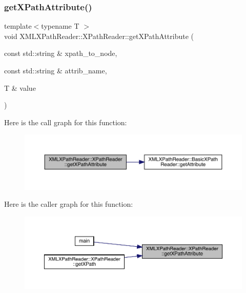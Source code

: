 \subsubsection{\texorpdfstring{getXPathAttribute()}{getXPathAttribute()}\hspace{0.1cm}{\footnotesize\ttfamily [1/2]}}
{\footnotesize\ttfamily template$<$typename T $>$ \\
void X\+M\+L\+X\+Path\+Reader\+::\+X\+Path\+Reader\+::get\+X\+Path\+Attribute (\begin{DoxyParamCaption}\item[{const std\+::string \&}]{xpath\+\_\+to\+\_\+node,  }\item[{const std\+::string \&}]{attrib\+\_\+name,  }\item[{T \&}]{value }\end{DoxyParamCaption})\hspace{0.3cm}{\ttfamily [inline]}}

Here is the call graph for this function\+:
\nopagebreak
\begin{figure}[H]
\begin{center}
\leavevmode
\includegraphics[width=350pt]{d3/d5a/classXMLXPathReader_1_1XPathReader_a0a5ca67826c2c8fdad784a3bbbba4b3c_cgraph}
\end{center}
\end{figure}
Here is the caller graph for this function\+:\nopagebreak
\begin{figure}[H]
\begin{center}
\leavevmode
\includegraphics[width=350pt]{d3/d5a/classXMLXPathReader_1_1XPathReader_a0a5ca67826c2c8fdad784a3bbbba4b3c_icgraph}
\end{center}
\end{figure}
\mbox{\label{classXMLXPathReader_1_1XPathReader_a0a5ca67826c2c8fdad784a3bbbba4b3c}} 
